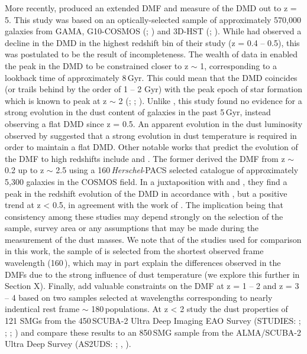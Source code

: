 More recently, \citealt{Driver_2018} produced an extended DMF and measure of the DMD out to z = 5. This study was based on an optically-selected sample of approximately 570,000 galaxies from GAMA, G10-COSMOS (\citealt{Davies_2015}; \citealt{Andrews_2017}) and 3D-HST (\citealt{Brammer_2012}; \citealt{Momcheva_2016}). While \citealt{Dunne_2011} had observed a decline in the DMD in the highest redshift bin of their study (z = 0.4 -- 0.5), this was postulated to be the result of incompleteness. The wealth of data in \citealt{Driver_2018} enabled the peak in the DMD to be constrained closer to z $\sim$ 1, corresponding to a lookback time of approximately 8\,Gyr. This could mean that the DMD coincides (or trails behind by the order of 1 -- 2 Gyr) with the peak epoch of star formation which is known to peak at z $\sim$ 2 (\citealt{Cucciati_2012}; \citealt{Burgarella_2013}; \citealt{Madau_2014}). Unlike \citealt{Dunne_2011}, this study found no evidence for a strong evolution in the dust content of galaxies in the past 5\,Gyr, instead observing a flat DMD since z = 0.5. An apparent evolution in the dust luminosity observed by \citealt{Driver_2018} suggested that a strong evolution in dust temperature is required in order to maintain a flat DMD. Other notable works that predict the evolution of the DMF to high redshifts include \citealt{Pozzi_2020} and \citealt{Dudzeviciute_2021}. The former derived the DMF from z $\sim$ 0.2 up to z $\sim$ 2.5 using a 160\,\micron \textit{Herschel}-PACS selected catalogue of approximately 5,300 galaxies in the COSMOS field. In a juxtaposition with \citealt{Dunne_2011} and \citealt{Driver_2018}, they find a peak in the redshift evolution of the DMD in accordance with \citealt{Driver_2018}, but a positive trend at z < 0.5, in agreement with the work of \citealt{Dunne_2011}. The implication being that consistency among these studies may depend strongly on the selection of the sample, survey area or any assumptions that may be made during the measurement of the dust masses. We note that of the studies used for comparison in this work, the sample of \citealt{Pozzi_2020} is selected from the shortest observed frame wavelength (160\,\micron), which may in part explain the differences observed in the DMFs due to the strong influence of dust temperature (we explore this further in Section {\color{red} X}). Finally, \citealt{Dudzeviciute_2021} add valuable constraints on the DMF at z = 1 -- 2 and z = 3 -- 4 based on two samples selected at wavelengths corresponding to nearly indentical rest frame $\sim$ 180\,\micron populations. At z < 2 \citealt{Dudzeviciute_2021} study the dust properties of 121 SMGs from the 450\,\micron SCUBA-2 Ultra Deep Imaging EAO Survey (STUDIES: \citealt{Wang_2017}; \citealt{Chang_2018}; \citealt{Lim_2020b}; \citealt{Lim_2020c}) and compare these results to an 850\,\micron SMG sample from the ALMA/SCUBA-2 Ultra Deep Survey (AS2UDS: \citealt{Stach_2018}; \citealt{Stach_2019}, \citealt{Dudzeviciute_2020}). 

